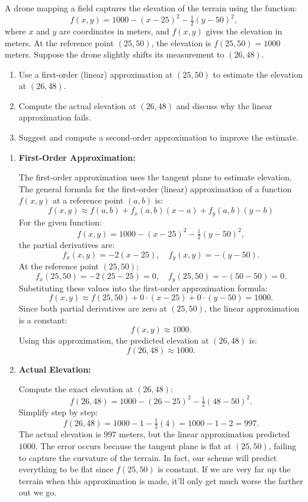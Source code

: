 \exampleline
\begin{example}
A drone mapping a field captures the elevation of the terrain using the function:
\[
f(x,y) = 1000 - (x-25)^2 - \tfrac{1}{2}(y-50)^2,
\]
where \(x\) and \(y\) are coordinates in meters, and \(f(x,y)\) gives the elevation in meters. At the reference point \((25,50)\), the elevation is \(f(25,50) = 1000\) meters. Suppose the drone slightly shifts its measurement to \((26,48)\).

\begin{enumerate}
    \item Use a first-order (linear) approximation at \((25,50)\) to estimate the elevation at \((26,48)\).
    \item Compute the actual elevation at \((26,48)\) and discuss why the linear approximation fails.
    \item Suggest and compute a second-order approximation to improve the estimate.
\end{enumerate}

\begin{solution}
\begin{enumerate}
    \item \textbf{First-Order Approximation:} 
    
    The first-order approximation uses the tangent plane to estimate elevation. The general formula for the first-order (linear) approximation of a function \( f(x,y) \) at a reference point \( (a,b) \) is:
    \[
    f(x,y) \approx f(a,b) + f_x(a,b)(x - a) + f_y(a,b)(y - b)
    \]
    For the given function:
    \[
    f(x,y) = 1000 - (x-25)^2 - \tfrac{1}{2}(y-50)^2,
    \]
    the partial derivatives are:
    \[
    f_x(x,y) = -2(x-25), \quad f_y(x,y) = -(y-50).
    \]
    At the reference point \((25,50)\):
    \[
    f_x(25,50) = -2(25-25) = 0, \quad f_y(25,50) = -(50-50) = 0.
    \]
    Substituting these values into the first-order approximation formula:
    \[
    f(x,y) \approx f(25,50) + 0 \cdot (x - 25) + 0 \cdot (y - 50) = 1000.
    \]
    Since both partial derivatives are zero at \((25,50)\), the linear approximation is a constant:
    \[
    f(x,y) \approx 1000.
    \]
    Using this approximation, the predicted elevation at \((26,48)\) is:
    \[
    f(26,48) \approx 1000.
    \]
    
    \item \textbf{Actual Elevation:}
    
    Compute the exact elevation at \((26,48)\):
    \[
    f(26,48) = 1000 - (26-25)^2 - \tfrac{1}{2}(48-50)^2.
    \]
    Simplify step by step:
    \[
    f(26,48) = 1000 - 1 - \tfrac{1}{2}(4) = 1000 - 1 - 2 = 997.
    \]
    The actual elevation is \(997\) meters, but the linear approximation predicted \(1000\). The error occurs because the tangent plane is flat at \((25,50)\), failing to capture the curvature of the terrain. In fact, our scheme will predict everything to be flat since $f(25,50)$ is constant. If we are very far up the terrain when this approximation is made, it'll only get much worse the farther out we go.
    

\end{enumerate}
\end{solution}
\end{example}
